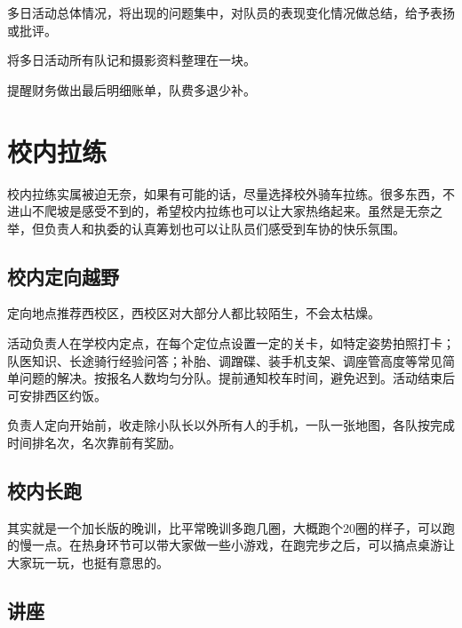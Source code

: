\documentclass{ctexbook}
\begin{document}
多日活动总体情况，将出现的问题集中，对队员的表现变化情况做总结，给予表扬或批评。

将多日活动所有队记和摄影资料整理在一块。

提醒财务做出最后明细账单，队费多退少补。


\section{校内拉练}
校内拉练实属被迫无奈，如果有可能的话，尽量选择校外骑车拉练。很多东西，不进山不爬坡是感受不到的，希望校内拉练也可以让大家热络起来。虽然是无奈之举，但负责人和执委的认真筹划也可以让队员们感受到车协的快乐氛围。

\subsection{校内定向越野}
定向地点推荐西校区，西校区对大部分人都比较陌生，不会太枯燥。

活动负责人在学校内定点，在每个定位点设置一定的关卡，如特定姿势拍照打卡；队医知识、长途骑行经验问答；补胎、调蹭碟、装手机支架、调座管高度等常见简单问题的解决。按报名人数均匀分队。提前通知校车时间，避免迟到。活动结束后可安排西区约饭。

负责人定向开始前，收走除小队长以外所有人的手机，一队一张地图，各队按完成时间排名次，名次靠前有奖励。
\subsection{校内长跑}
其实就是一个加长版的晚训，比平常晚训多跑几圈，大概跑个20圈的样子，可以跑的慢一点。在热身环节可以带大家做一些小游戏，在跑完步之后，可以搞点桌游让大家玩一玩，也挺有意思的。
\subsection{讲座}
\end{document}
